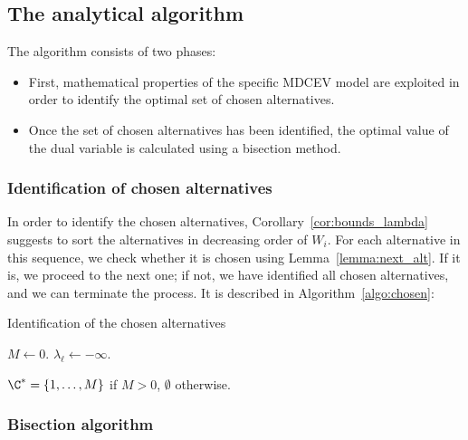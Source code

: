 \documentclass[12pt,a4paper]{article}
\begin{document}
\subsection{The analytical algorithm}


The  algorithm consists of two phases:
\begin{itemize}
    \item First, mathematical properties of the specific MDCEV model
are exploited in order to identify the optimal set of chosen alternatives.
    \item Once the set of chosen alternatives has been identified, the optimal value of the dual variable is calculated using a bisection method.
\end{itemize}

\subsubsection*{Identification of chosen alternatives}





In order to identify the chosen alternatives, Corollary~\ref{cor:bounds_lambda} suggests to sort the alternatives in decreasing
order of $W_i$. For each alternative in this sequence, we check whether it is chosen using Lemma~\ref{lemma:next_alt}. If it is, we proceed to the next
one; if not, we have identified all chosen alternatives, and we can terminate the process.
It is described in Algorithm~\ref{algo:chosen}:

\begin{algorithm}[htb]
\caption{\label{algo:chosen}Identification of the chosen alternatives}
\DontPrintSemicolon
{}
\BlankLine

$M \leftarrow 0$.\;
$\lambda_\ell \leftarrow -\infty$.\;

    $\C^*= \{1,\ldots, M \}$ if $M>0$, $\emptyset$ otherwise.
\end{algorithm}


\subsubsection*{Bisection algorithm}
\end{document}
